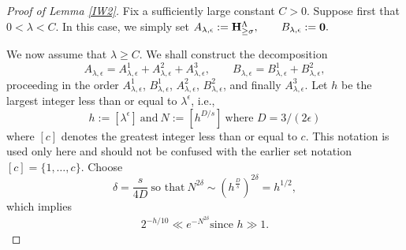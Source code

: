 \documentclass[11 pt,letterpaper]{amsart}
\theoremstyle{plain}
\theoremstyle{definition}
\theoremstyle{remark} \theoremstyle{exam} \theoremstyle{ob}
\numberwithin{equation}{section}
\begin{document}
\begin{proof}[Proof of Lemma \ref{IW2}]
	Fix a sufficiently large constant $C>0$. Suppose first that
	$0<\lambda<C$. In this case, we simply set 
	$A_{\lambda,\epsilon}:={\bf H}_{\ge \sigma}^{\Lambda},
	\qquad
	B_{\lambda,\epsilon}:={\bf 0}.$

	
We now assume that $\lambda\ge C$. We shall construct the decomposition
	\[
	A_{\lambda,\epsilon}
	=
	A_{\lambda,\epsilon}^{1}
	+
	A_{\lambda,\epsilon}^{2}
	+
	A_{\lambda,\epsilon}^{3},
	\qquad
	B_{\lambda,\epsilon}
	=
	B_{\lambda,\epsilon}^{1}
	+
	B_{\lambda,\epsilon}^{2},
	\]
	proceeding in the order
	\(A_{\lambda,\epsilon}^{1}\),
\(B_{\lambda,\epsilon}^{1}\),
	\(A_{\lambda,\epsilon}^{2}\),
	\(B_{\lambda,\epsilon}^{2}\),
	and finally
	\(A_{\lambda,\epsilon}^{3}\).
	Let $h$ be the largest integer less than or equal to $\lambda^{\epsilon}$, i.e.,
\[
h := [\lambda^{\epsilon}]\ \text{and}\  N:=[h^{D/s}]\ \text{where $D=3/(2\epsilon)$}
\]
where  $[c]$ denotes the greatest integer less than or equal to $c$. This notation is used only here and should not be confused with the earlier set notation $[c]=\{1,\dots,c\}$.  	Choose $$\delta=\frac{s}{4D}\ \text{so that}\ N^{2\delta}\sim (h^{\frac{D}{s}})^{2\delta}=h^{1/2},$$  
which implies \begin{align}\label{hh}
  2^{-h/10}\ll e^{-N^{2 \delta}} \text{since $h\gg1$}.
\end{align}


\end{proof}
\end{document}
